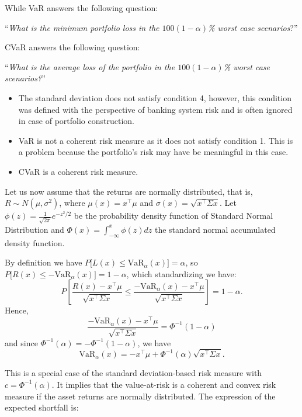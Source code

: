 While VaR answers the following question:

``\textit{What is the minimum portfolio loss in the $100(1-\alpha)$\% worst case scenarios}?''


CVaR answers the following question:

``\textit{What is the average loss of the portfolio in the $100(1-\alpha)$\% worst case scenarios?}''

\begin{remark}\normalfont \hspace{1cm}
	\begin{itemize}
		\item The standard deviation does not satisfy condition 4, however, this condition was defined with the perspective of banking system risk and is often ignored in case of portfolio construction.
		\item VaR is not a coherent risk measure as it does not satisfy condition 1. This is a problem because the portfolio’s risk may have be meaningful in this case.
		\item CVaR is a coherent risk measure.
	\end{itemize}
\end{remark}


Let us now assume that the returns are normally distributed, that is, $R\sim N(\mu,\sigma^2)$, where $\mu(x)=x^\top\mu$ and
$\sigma(x)=\sqrt{x^\top \Sigma x}$. Let $\phi(z) = \frac{1}{\sqrt{2\pi}}e^{-z^2/2}$ be the probability density function of Standard Normal Distribution and $\Phi(x) = \int_{-\infty}^{x}\phi(z) dz$
the standard normal accumulated density function.

By definition we have
$P\Big[L(x)\leq \mbox{VaR}_\alpha(x)\Big]=\alpha$, so
$P\Big[R(x)\leq -\mbox{VaR}_\alpha(x)\Big]=1-\alpha$, which standardizing
we have:
\[
	P\left[ \frac{R(x)-x^\top\mu}{\sqrt{x^\top \Sigma x}} \leq \frac{-\mbox{VaR}_\alpha(x)- x^\top\mu}{\sqrt{x^\top \Sigma x}}
		\right]=1-\alpha.
\]
Hence,
\[
	\frac{-\mbox{VaR}_\alpha(x)-x^\top\mu}{\sqrt{x^\top \Sigma x}}=\Phi^{-1}(1-\alpha)
\] and since $\Phi^{-1}(\alpha)=-\Phi^{-1}(1-\alpha)$, we have
\begin{equation}\label{eq:var2}
	\mbox{VaR}_\alpha(x)=-x^\top\mu+ \Phi^{-1}(\alpha)\sqrt{x^\top \Sigma x}.
\end{equation}

This is a special case of the standard deviation-based risk measure with $c = \Phi^{-1} (\alpha)$. It implies that the value-at-risk is a coherent and convex risk measure if the asset returns are normally distributed. The expression of the expected shortfall is:


